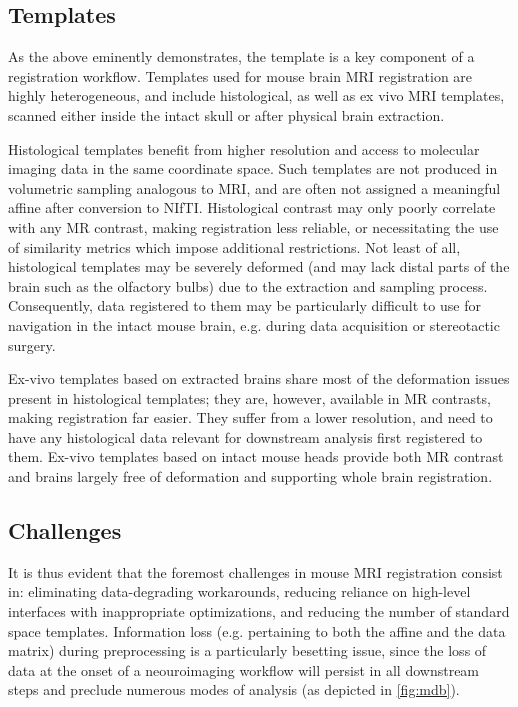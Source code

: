 \subsection{Templates}
As the above eminently demonstrates, the template is a key component of a registration workflow.
Templates used for mouse brain MRI registration are highly heterogeneous, and include histological, as well as ex vivo MRI templates, scanned either inside the intact skull or after physical brain extraction.

Histological templates benefit from higher resolution and access to molecular imaging data in the same coordinate space.
Such templates are not produced in volumetric sampling analogous to MRI, and are often not assigned a meaningful affine after conversion to NIfTI.
Histological contrast may only poorly correlate with any MR contrast, making registration less reliable, or necessitating the use of similarity metrics which impose additional restrictions.
Not least of all, histological templates may be severely deformed (and may lack distal parts of the brain such as the olfactory bulbs) due to the extraction and sampling process.
Consequently, data registered to them may be particularly difficult to use for navigation in the intact mouse brain, e.g. during data acquisition or stereotactic surgery.

Ex-vivo templates based on extracted brains share most of the deformation issues present in histological templates;
they are, however, available in MR contrasts, making registration far easier.
They suffer from a lower resolution, and need to have any histological data relevant for downstream analysis first registered to them.
Ex-vivo templates based on intact mouse heads provide both MR contrast and brains largely free of deformation and supporting whole brain registration.

\subsection{Challenges}
It is thus evident that the foremost challenges in mouse MRI registration consist in: eliminating data-degrading workarounds, reducing reliance on high-level interfaces with inappropriate optimizations, and reducing the number of standard space templates.
Information loss (e.g. pertaining to both the affine and the data matrix) during preprocessing is a particularly besetting issue, since the loss of data at the onset of a neouroimaging workflow will persist in all downstream steps and preclude numerous modes of analysis (as depicted in \cref{fig:mdb}).
